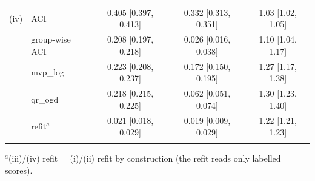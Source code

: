 \begin{tabular}{@{}llccc@{}}
\addlinespace
(iv) & ACI & 0.405 [0.397, 0.413] & 0.332 [0.313, 0.351] & 1.03 [1.02, 1.05] \\
 & group-wise ACI & 0.208 [0.197, 0.218] & 0.026 [0.016, 0.038] & 1.10 [1.04, 1.17] \\
 & mvp\_log & 0.223 [0.208, 0.237] & 0.172 [0.150, 0.195] & 1.27 [1.17, 1.38] \\
 & qr\_ogd & 0.218 [0.215, 0.225] & 0.062 [0.051, 0.074] & 1.30 [1.23, 1.40] \\
 & refit$^a$ & 0.021 [0.018, 0.029] & 0.019 [0.009, 0.029] & 1.22 [1.21, 1.23] \\
\addlinespace
\bottomrule
\end{tabular}

\smallskip\parbox{\linewidth}{\footnotesize $^a$(iii)/(iv) refit = (i)/(ii) refit by construction (the refit reads only labelled scores).}
